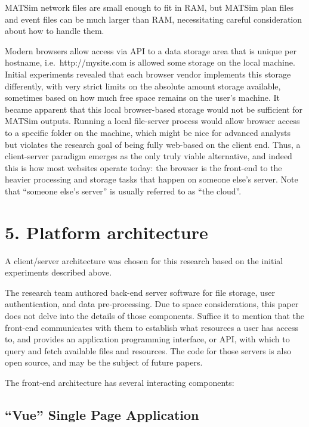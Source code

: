 MATSim network files are small enough to fit in RAM, but MATSim plan
files and event files can be much larger than RAM, necessitating careful
consideration about how to handle them.

Modern browsers allow access via API to a data storage area that is
unique per hostname, i.e.~http://mysite.com is allowed some storage on
the local machine. Initial experiments revealed that each browser vendor
implements this storage differently, with very strict limits on the
absolute amount storage available, sometimes based on how much free
space remains on the user's machine. It became apparent that this local
browser-based storage would not be sufficient for MATSim outputs.
Running a local file-server process would allow browser access to a
specific folder on the machine, which might be nice for advanced
analysts but violates the research goal of being fully web-based on the
client end. Thus, a client-server paradigm emerges as the only truly
viable alternative, and indeed this is how most websites operate today:
the browser is the front-end to the heavier processing and storage tasks
that happen on someone else's server. Note that ``someone else's
server'' is usually referred to as ``the cloud''.

\hypertarget{platform-architecture}{%
\section{5. Platform architecture}\label{platform-architecture}}

A client/server architecture was chosen for this research based on the
initial experiments described above.

The research team authored back-end server software for file storage,
user authentication, and data pre-processing. Due to space
considerations, this paper does not delve into the details of those
components. Suffice it to mention that the front-end communicates with
them to establish what resources a user has access to, and provides an
application programming interface, or API, with which to query and fetch
available files and resources. The code for those servers is also open
source, and may be the subject of future papers.

The front-end architecture has several interacting components:

\hypertarget{vue-single-page-application}{%
\subsection{``Vue'' Single Page
Application}\label{vue-single-page-application}}

